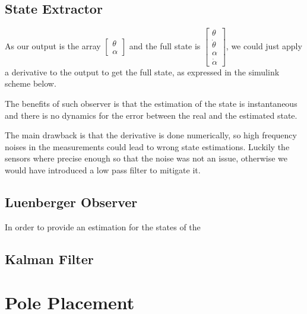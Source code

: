             \subsection{State Extractor}

                As our output is the array 
                $\begin{bmatrix}
                    \theta \\
                    \alpha
                \end{bmatrix}$
                and the full state is 
                $\begin{bmatrix}
                    \theta \\
                    \dot\theta \\
                    \alpha \\
                    \dot\alpha 
                \end{bmatrix}$,
                we could just apply a derivative to the output to get the full state, as expressed in the simulink scheme below.


                The benefits of such observer is that the estimation of the state is instantaneous and there is no dynamics for the error between the real and the estimated state.

                The main drawback is that the derivative is done numerically, so high frequency noises in the measurements could lead to wrong state estimations.
                Luckily the sensors where precise enough so that the noise was not an issue, otherwise we would have introduced a low pass filter to mitigate it.


            \subsection{Luenberger Observer}

                In order to provide an estimation for the states of the 

            \subsection{Kalman Filter}

            \section{Pole Placement}

